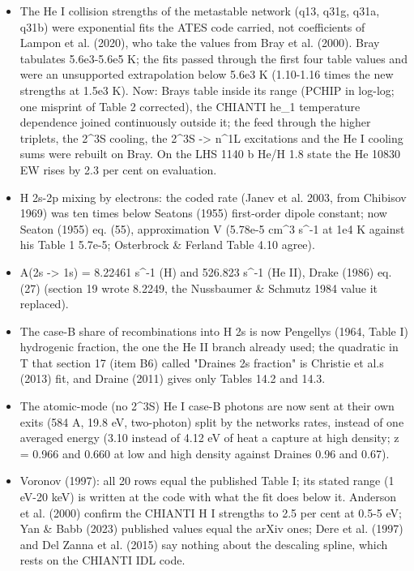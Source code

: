 \documentclass[english,a4paper]{my_memo}
\providecommand{\tightlist}{\setlength{\itemsep}{0pt}\setlength{\parskip}{0pt}}
\begin{document}
\begin{itemize}
\tightlist
\item
  The He I collision strengths of the metastable network (q13, q31g, q31a,
  q31b) were exponential fits the ATES code carried, not coefficients of
  Lampon et al. (2020), who take the values from Bray et al. (2000). Bray
  tabulates 5.6e3-5.6e5 K; the fits passed through the first four table
  values and were an unsupported extrapolation below 5.6e3 K (1.10-1.16
  times the new strengths at 1.5e3 K). Now: Bray\textquotesingle s table inside its range
  (PCHIP in log-log; one misprint of Table 2 corrected), the CHIANTI he\_1
  temperature dependence joined continuously outside it; the feed through
  the higher triplets, the 2\^{}3S cooling, the 2\^{}3S -\textgreater{} n\^{}1L excitations and
  the He I cooling sums were rebuilt on Bray. On the LHS 1140 b He/H 1.8
  state the He 10830 EW rises by 2.3 per cent on evaluation.
\item
  H 2s-2p mixing by electrons: the coded rate (Janev et al. 2003, from
  Chibisov 1969) was ten times below Seaton\textquotesingle s (1955) first-order dipole
  constant; now Seaton (1955) eq. (55), approximation V (5.78e-5 cm\^{}3 s\^{}-1 at
  1e4 K against his Table 1 5.7e-5; Osterbrock \& Ferland Table 4.10 agree).
\item
  A(2s -\textgreater{} 1s) = 8.22461 s\^{}-1 (H) and 526.823 s\^{}-1 (He II), Drake (1986)
  eq. (27) (section 19 wrote 8.2249, the Nussbaumer \& Schmutz 1984 value it
  replaced).
\item
  The case-B share of recombinations into H 2s is now Pengelly\textquotesingle s (1964,
  Table I) hydrogenic fraction, the one the He II branch already used; the
  quadratic in T that section 17 (item B6) called "Draine\textquotesingle s 2s fraction" is
  Christie et al.\textquotesingle s (2013) fit, and Draine (2011) gives only Tables 14.2 and
  14.3.
\item
  The atomic-mode (no 2\^{}3S) He I case-B photons are now sent at their own
  exits (584 A, 19.8 eV, two-photon) split by the network\textquotesingle s rates, instead
  of one averaged energy (3.10 instead of 4.12 eV of heat a capture at high
  density; z = 0.966 and 0.660 at low and high density against Draine\textquotesingle s
  0.96 and 0.67).
\item
  Voronov (1997): all 20 rows equal the published Table I; its stated range
  (1 eV-20 keV) is written at the code with what the fit does below it.
  Anderson et al. (2000) confirm the CHIANTI H I strengths to 2.5 per cent at
  0.5-5 eV; Yan \& Babb (2023) published values equal the arXiv ones; Dere et
  al. (1997) and Del Zanna et al. (2015) say nothing about the descaling
  spline, which rests on the CHIANTI IDL code.
\end{itemize}
\end{document}
